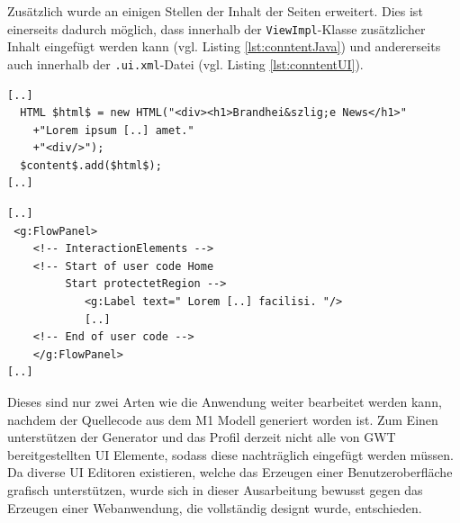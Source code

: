 Zusätzlich wurde an einigen Stellen der Inhalt der Seiten erweitert. Dies ist
einerseits dadurch möglich, dass innerhalb der \texttt{ViewImpl}-Klasse
zusätzlicher Inhalt eingefügt werden kann (vgl. Listing \ref{lst:conntentJava})
und andererseits auch innerhalb der \texttt{.ui.xml}-Datei (vgl. Listing
\ref{lst:conntentUI}).

\lstset{language=gwt}
\begin{lstlisting}[caption={Einfügen von Inhalten auf einer Seite durch
Veränderungen am Java-Code},
label={lst:conntentJava}] 
[..] 
  HTML $html$ = new HTML("<div><h1>Brandhei&szlig;e News</h1>"
	+"Lorem ipsum [..] amet."
	+"<div/>");
  $content$.add($html$);
[..]
\end{lstlisting}
\lstset{language=uixml}
\begin{lstlisting}[caption={Einfügen von Inhalten auf einer Seite durch
Veränderungen in der \texttt{.ui.xml}-Datei},
label={lst:conntentUI}] 
[..] 
 <g:FlowPanel>
	<!-- InteractionElements -->
	<!-- Start of user code Home 
	     Start protectetRegion -->
			<g:Label text=" Lorem [..] facilisi. "/>
			[..]		
	<!-- End of user code -->
	</g:FlowPanel>
[..]
\end{lstlisting}

Dieses sind nur zwei Arten wie die Anwendung weiter bearbeitet werden kann,
nachdem der Quellecode aus dem M1 Modell generiert worden ist. Zum Einen
unterstützen der Generator und das Profil derzeit nicht alle von GWT
bereitgestellten UI Elemente, sodass diese nachträglich eingefügt werden
müssen. Da diverse UI Editoren existieren, welche das Erzeugen einer
Benutzeroberfläche grafisch unterstützen, wurde sich in dieser Ausarbeitung
bewusst gegen das Erzeugen einer Webanwendung, die vollständig designt wurde,
entschieden. 
